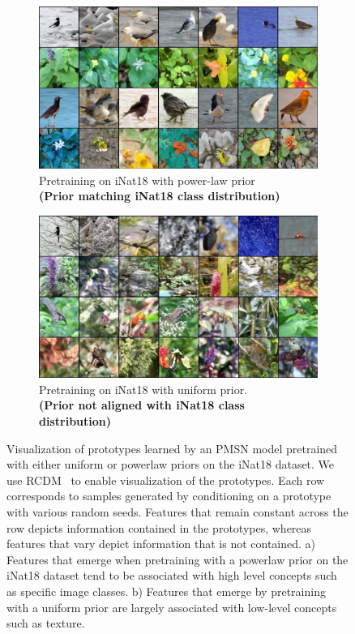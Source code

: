 \documentclass{article} %
\begin{document}
\begin{figure}[h]
    \centering
    \begin{subfigure}{0.49\textwidth}
        \centering
        \includegraphics[width=\textwidth]{assets/MSN2_prior_powerlaw.pdf}
        \caption{
        Pretraining on iNat18 with power-law prior\\
        {\bf (Prior matching iNat18 class distribution)}
        }
        \label{fig:visu_rcdm_inat_powerlaw}
    \end{subfigure}
    \begin{subfigure}{0.49\textwidth}
        \centering
        \includegraphics[width=\textwidth]{assets/MSN2_prior_uniform.pdf}
        \caption{
        Pretraining on iNat18 with uniform prior.\\
        {\bf (Prior not aligned with iNat18 class distribution)}
        }
        \label{fig:visu_rcdm_inat_uniforme}
    \end{subfigure}
    \caption{Visualization of prototypes learned by an PMSN model pretrained with either uniform or powerlaw priors on the iNat18 dataset. We use RCDM~\citep{bordes2022high} to enable visualization of the prototypes. Each row corresponds to samples generated by conditioning on a prototype with various random seeds. Features that remain constant across the row depicts information contained in the prototypes, whereas features that vary depict information that is not contained.
    a) Features that emerge when pretraining with a powerlaw prior on the iNat18 dataset tend to be associated with high level concepts such as specific image classes. 
    b) Features that emerge by pretraining with a uniform prior are largely associated with low-level concepts such as texture.}
    \label{fig:visu_rcdm_inat}
\end{figure}
\end{document}
